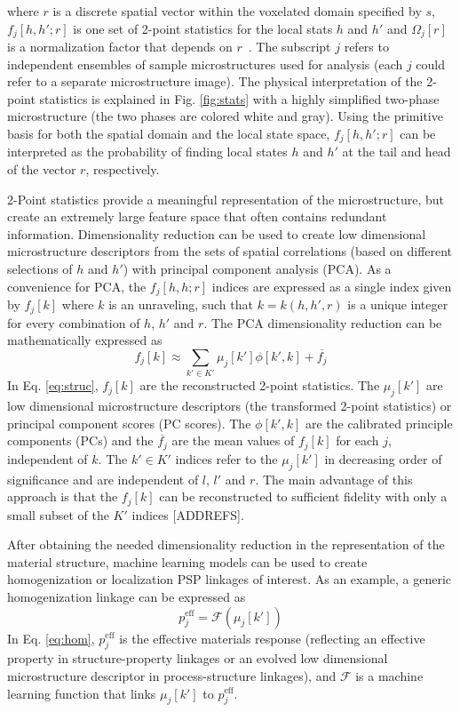 \documentclass{bmcart}
\begin{document}
where $r$ is a discrete spatial vector within the voxelated domain
specified by $s$, $f_j[h, h'; r]$ is one set of 2-point statistics for
the local stats $h$ and $h'$ and $\Omega_j\left[r\right]$ is a
normalization factor that depends on
$r$~\cite{cecen2016versatile}. The subscript $j$ refers to independent
ensembles of sample microstructures used for analysis (each $j$ could
refer to a separate microstructure image).  The physical
interpretation of the 2-point statistics is explained in
Fig. \ref{fig:stats} with a highly simplified two-phase microstructure
(the two phases are colored white and gray). Using the primitive basis
for both the spatial domain and the local state space, $f_j[h, h'; r]$
can be interpreted as the probability of finding local states $h$ and
$h'$ at the tail and head of the vector $r$, respectively.

2-Point statistics provide a meaningful representation of the
microstructure, but create an extremely large feature space that often
contains redundant information. Dimensionality reduction can be used
to create low dimensional microstructure descriptors from the sets of
spatial correlations (based on different selections of $h$ and $h'$)
with principal component analysis (PCA). As a convenience for PCA, the
$f_j\left[h, h; r\right]$ indices are expressed as a single index given
by $f_j\left[k\right]$ where $k$ is an unraveling, such that
$k=k\left(h, h', r\right)$ is a unique integer for every combination
of $h$, $h'$ and $r$. The PCA dimensionality reduction can be
mathematically expressed as
\begin{equation} \label{eq:struc}
    f_j\left[k\right] \approx \sum_{k'\in K'} \mu_j\left[k'\right] \phi\left[k',
      k\right] + \overline{f_j}
\end{equation}
In Eq. \ref{eq:struc}, $f_j\left[k\right]$ are the reconstructed
2-point statistics. The $\mu_j[k']$ are low dimensional microstructure
descriptors (the transformed 2-point statistics) or principal
component scores (PC scores). The $\phi\left[k', k\right]$ are the
calibrated principle components (PCs) and the $\overline{f_j}$ are the
mean values of $f_j\left[k\right]$ for each $j$, independent of
$k$. The $k' \in K'$ indices refer to the $\mu_j\left[k'\right]$ in
decreasing order of significance and are independent of $l$, $l'$ and
$r$. The main advantage of this approach is that the
$f_j\left[k\right]$ can be reconstructed to sufficient fidelity with
only a small subset of the $K'$ indices [ADDREFS].

After obtaining the needed dimensionality reduction in the
representation of the material structure, machine learning models can
be used to create homogenization or localization PSP linkages of
interest. As an example, a generic homogenization linkage can be
expressed as
\begin{equation} \label{eq:hom}
    p_j^{\text{eff}} = \mathcal{F}(\mu_j[k'])
\end{equation}
In Eq. \ref{eq:hom}, $p_j^{\text{eff}}$ is the effective materials
response (reflecting an effective property in structure-property
linkages or an evolved low dimensional microstructure descriptor in
process-structure linkages), and $\mathcal{F}$ is a machine learning
function that links $\mu_j[k']$ to $p_j^{\text{eff}}$.
\end{document}
